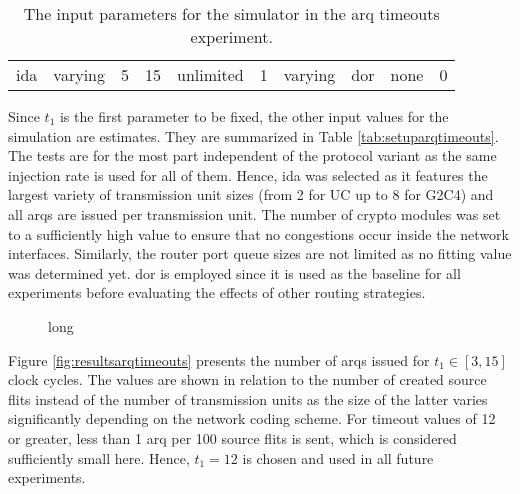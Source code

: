 \begin{table}
    \centering
    \begin{tabulary}{\textwidth}{C|C|C|C|C|C|C|C|C|C}
        \pProtVar{} & \pNCMode{} & \pEncMods{} & \pAuthMods{} & \pRQSize{} & \pARQLimit{} & \pARQTimeout{} & \pRStrat{} & \pAttackerSet{} & \pAttackProb{} \\\hline
        \gls{ida}   & varying    & 5           & 15           & unlimited  & 1            & varying        & \gls{dor}  & none            & 0              \\
    \end{tabulary}
    \caption[Input parameters for ARQ timeouts experiment]{The input parameters for the simulator in the \gls{arq} timeouts experiment.}
    \label{tab:setuparqtimeouts}
\end{table}

Since $t_1$ is the first parameter to be fixed, the other input values for the simulation are estimates. They are summarized in Table
\vref{tab:setuparqtimeouts}. The tests are for the most part independent of the protocol variant as the same injection rate is used for all of them.
Hence, \gls{ida} was selected as it features the largest variety of transmission unit sizes (from 2 for UC up to 8 for G2C4) and all \glspl{arq} are
issued per transmission unit. The number of crypto modules was set to a sufficiently high value to ensure that no congestions occur inside the network
interfaces. Similarly, the router port queue sizes are not limited as no fitting value was determined yet. \Gls{dor} is employed since it is used as
the baseline for all experiments before evaluating the effects of other routing strategies.

\begin{figure}
    \centering
    
    \caption[Results for ARQ timeouts experiment]{long}
    \label{fig:resultsarqtimeouts}
\end{figure}

Figure \vref{fig:resultsarqtimeouts} presents the number of \glspl{arq} issued for $t_1 \in [3, 15]$ clock cycles. The values are shown in relation to
the number of created source flits instead of the number of transmission units as the size of the latter varies significantly depending on the network
coding scheme. For timeout values of 12 or greater, less than 1 \gls{arq} per 100 source flits is sent, which is considered sufficiently small here.
Hence, $t_1 = 12$ is chosen and used in all future experiments.

